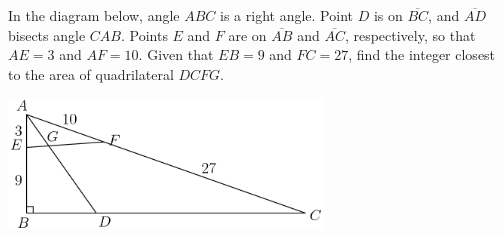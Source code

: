 In the diagram below, angle $ABC$ is a right angle.  Point $D$ is on $\overline{BC}$, and $\overline{AD}$ bisects angle $CAB$.  Points $E$ and $F$ are on $\overline{AB}$ and $\overline{AC}$, respectively, so that $AE=3$ and $AF=10.$  Given that $EB=9$ and $FC=27$, find the integer closest to the area of quadrilateral $DCFG.$

\begin{center}
\includegraphics[width = 83.60000000000001mm]{img/fig0.png}
\end{center}